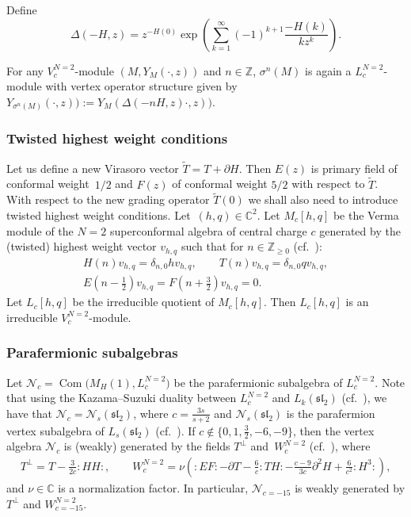 \documentclass[pdftex]{sigma}
\numberwithin{equation}{section}
\newcommand{\Z}{\mathbb Z}
\newcommand{\C}{\mathbb C}
\begin{document}
Define
\[
 \Delta (-H,z) = z^{-H(0)}\exp \left ( \sum _{k=1} ^{\infty} (-1)^{k+1}\frac{-H(k) }{kz^k}\right ).
 \]

For any $V^{N=2}_{c}$-module $(M, Y_M(\cdot, z))$ and $n \in \mathbb{Z}$,
$\sigma^ n (M)$ is again a $L^{N=2}_{c}$-module with vertex operator structure given by
$ Y_{\sigma ^n (M) } ( \cdot , z)) := Y_{ M } (\Delta ( -n H, z) \cdot , z))$.

\subsubsection{Twisted highest weight conditions}
Let us define a new Virasoro vector $\widetilde T = T + \partial H$. Then $E(z)$ is primary field of conformal weight~$1/2$ and $F(z)$ of conformal weight $5/2$ with respect to $\widetilde T$.
 With respect to the new grading operator $\widetilde T(0)$ we shall also need to introduce twisted highest weight conditions.
 Let~${(h,q) \in {\C}^2}$. Let $M_c[h,q]$ be the Verma module of the $N=2$ superconformal algebra of central charge $c$ generated by the (twisted) highest weight vector $v_{h,q}$ such that for $n \in {\Z}_{\ge 0}$ (cf.\ \cite{FST}):
\begin{gather*}
 H(n) v_{h,q} =\delta_{n, 0} h v_{h,q}, \qquad T(n) v_{h,q} = \delta_{n,0} q v_{h,q}, \\ E\left(n-\frac{1}{2}\right) v_{h,q} = F\left(n+\frac{3}{2}\right) v_{h,q} =0.
 \end{gather*}
 Let $L_c[h,q]$ be the irreducible quotient of $M_c[h,q]$. Then $L_c[h,q]$ is an irreducible $V_c^{N=2}$-module.

\subsubsection{Parafermionic subalgebras}
\label{paraferm-1}
Let $ \mathcal N_c = \operatorname{Com} \bigl(M_H(1) , L^{N=2}_{c}\bigr) $ be the parafermionic subalgebra of $L^{N=2}_{c}$. Note that using the Kazama--Suzuki duality between $L^{N=2} _c$ and $L_k(\mathfrak{sl}_2)$ (cf.\ \cite{A-IMRN, FST}), we have that
$\mathcal N_c = \mathcal N_s (\mathfrak{sl}_2)$, where $c =\frac{3s}{s+2}$ and
$\mathcal N_s (\mathfrak{sl}_2)$ is the parafermion vertex subalgebra of $L_s(\mathfrak{sl}_2)$ (cf.\ \cite{DLY}). If $c \notin \{ 0, 1, \frac{3}{2}, -6, -9\}$, then the vertex algebra $ \mathcal N_c $ is (weakly) generated by the fields $ T^{\perp}$ and~$W^{N=2}_{c}$ (cf.\ \cite{BEHHH,DLY}), where
\begin{gather*}
	 T^{\perp} = T - \frac{3}{2c}{:}HH{:}, \qquad
	W^{N=2}_{c} = \nu \left({:} E F{:} - \partial T -\frac{6}{c}{:} T H{:} - \frac{c-9}{3c}\partial^2H + \frac{6}{c^2}{:}H^3{:} \right),
\end{gather*}
and $\nu \in \mathbb{C}$ is a normalization factor. In particular, $\mathcal N_{c=-15}$ is weakly generated by $T^{\perp}$ and $W^{N=2}_{c=-15}$.
\end{document}
